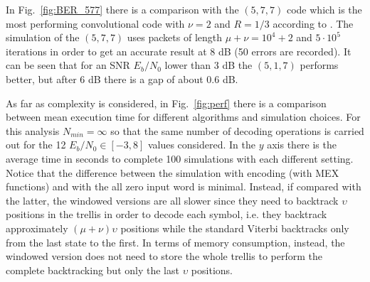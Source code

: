 \documentclass[10pt]{article}
\newlength\fheight
\newlength\fwidth
\begin{document}
In Fig.~\ref{fig:BER_577} there is a comparison with the $(5, 7, 7)$ code which is the most performing convolutional code with $\nu = 2$ and $R=1/3$ according to \cite{proakis}. The simulation of the $(5,7,7)$ uses packets of length $\mu + \nu = 10^4 + 2$ and $5\cdot10^{5}$ iterations in order to get an accurate result at 8 dB (50 errors are recorded). It can be seen that for an SNR $E_b/N_0$ lower than 3 dB the $(5,1,7)$ performs better, but after 6 dB there is a gap of about 0.6 dB.

As far as complexity is considered, in Fig.~\ref{fig:perf} there is a comparison between mean execution time for different algorithms and simulation choices. 
For this analysis $N_{min} = \infty$ so that the same number of decoding operations is carried out for the 12 $E_b/N_0 \in [-3, 8]$ values considered. 
In the $y$ axis there is the average time in seconds to complete 100 simulations with each different setting. 
Notice that the difference between the simulation with encoding (with MEX functions) and with the all zero input word is minimal. Instead, if compared with the latter, the windowed versions are all slower since they need to backtrack $\upsilon$ positions in the trellis in order to decode each symbol, i.e. they backtrack approximately $(\mu + \nu)\upsilon$ positions while the standard Viterbi backtracks only from the last state to the first. In terms of memory consumption, instead, the windowed version does not need to store the whole trellis to perform the complete backtracking but only the last $\upsilon$ positions. 

\begin{figure*}[h]
\centering
{}
\hfil
{}
\hfil
{}
\hfil
{}
\end{figure*}

\clearpage
\end{document}
